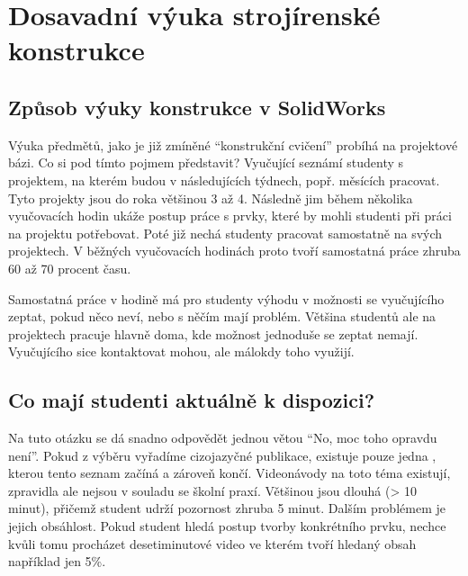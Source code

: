 \chapter{Dosavadní výuka strojírenské konstrukce}


\section{Způsob výuky konstrukce v SolidWorks}
    Výuka předmětů, jako je již zmíněné \enquote{konstrukční cvičení} probíhá na projektové bázi.
    Co si pod tímto pojmem představit?
    Vyučující seznámí studenty s projektem, na kterém budou v následujících týdnech, popř. měsících pracovat. 
    Tyto projekty jsou do roka většinou 3 až 4.
    Následně jim během několika vyučovacích hodin ukáže postup práce s prvky, které by mohli studenti při práci na projektu potřebovat.
    Poté již nechá studenty pracovat samostatně na svých projektech.
    V běžných vyučovacích hodinách proto tvoří samostatná práce zhruba 60 až 70 procent času.

    Samostatná práce v hodině má pro studenty výhodu v možnosti se vyučujícího zeptat, pokud něco neví, nebo s něčím mají problém.
    Většina studentů ale na projektech pracuje hlavně doma, kde možnost jednoduše se zeptat nemají.
    Vyučujícího sice kontaktovat mohou, ale málokdy toho využijí.

\section{Co mají studenti aktuálně k dispozici?}
    Na tuto otázku se dá snadno odpovědět jednou větou \enquote{No, moc toho opravdu není}.
    Pokud z výběru vyřadíme cizojazyčné publikace, existuje pouze jedna , kterou tento seznam začíná a zároveň končí. 
    Videonávody na toto téma existují, zpravidla ale nejsou v souladu se školní praxí.
    Většinou jsou dlouhá (> 10 minut), přičemž student udrží pozornost zhruba 5 minut.
    Dalším problémem je jejich obsáhlost.
    Pokud student hledá postup tvorby konkrétního prvku, nechce kvůli tomu procházet desetiminutové video ve kterém tvoří hledaný obsah například jen 5\%. 
